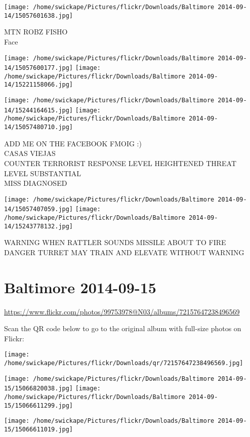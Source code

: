 \documentclass[10pt,letterpaper]{article}
\begin{document}
\vspace{0.25in}
\texttt{[image: /home/swickape/Pictures/flickr/Downloads/Baltimore 2014-09-14/15057601638.jpg]}

MTN ROBZ FISHO\\
Face
\pagebreak

\texttt{[image: /home/swickape/Pictures/flickr/Downloads/Baltimore 2014-09-14/15057600177.jpg]}
\texttt{[image: /home/swickape/Pictures/flickr/Downloads/Baltimore 2014-09-14/15221158066.jpg]}

\texttt{[image: /home/swickape/Pictures/flickr/Downloads/Baltimore 2014-09-14/15244164615.jpg]}
\texttt{[image: /home/swickape/Pictures/flickr/Downloads/Baltimore 2014-09-14/15057480710.jpg]}

ADD ME ON THE FACEBOOK FMOIG :)\\
CASAS VIEJAS\\
COUNTER TERRORIST RESPONSE LEVEL HEIGHTENED THREAT LEVEL SUBSTANTIAL\\
MISS DIAGNOSED
\pagebreak

\texttt{[image: /home/swickape/Pictures/flickr/Downloads/Baltimore 2014-09-14/15057407059.jpg]}
\texttt{[image: /home/swickape/Pictures/flickr/Downloads/Baltimore 2014-09-14/15243778132.jpg]}

WARNING WHEN RATTLER SOUNDS MISSILE ABOUT TO FIRE\\
DANGER TURRET MAY TRAIN AND ELEVATE WITHOUT WARNING
\pagebreak

\section*{Baltimore 2014-09-15}

\url{https://www.flickr.com/photos/99753978@N03/albums/72157647238496569}

Scan the QR code below to go to the original album with full-size photos on Flickr:

\texttt{[image: /home/swickape/Pictures/flickr/Downloads/qr/72157647238496569.jpg]}
\pagebreak

\texttt{[image: /home/swickape/Pictures/flickr/Downloads/Baltimore 2014-09-15/15066820038.jpg]}
\texttt{[image: /home/swickape/Pictures/flickr/Downloads/Baltimore 2014-09-15/15066611299.jpg]}

\vspace{0.25in}
\texttt{[image: /home/swickape/Pictures/flickr/Downloads/Baltimore 2014-09-15/15066611019.jpg]}
\end{document}
